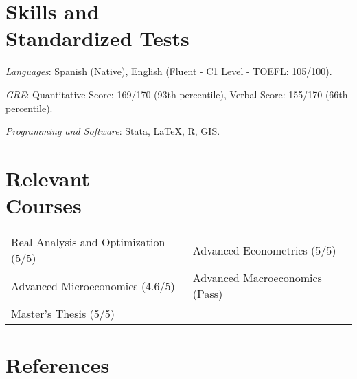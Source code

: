 \documentclass[margin,line]{res}
\begin{document}
\begin{resume}
\vspace{-.2cm}

\section{\sc Skills  and \\ Standardized Tests}

\textit{Languages}: Spanish (Native), English (Fluent - C1 Level - TOEFL: 105/100).

\vspace{-.2cm}

\textit{GRE}: Quantitative Score: 169/170 (93th percentile), Verbal Score: 155/170 (66th percentile).

\vspace{-.2cm}

\textit{Programming and Software}: Stata, {\LaTeX}, \textsc{R}, \textsc{GIS}. 


\section{\sc Relevant \\ Courses}

\begin{tabular}{p{7cm}p{7cm}}
 Real Analysis and Optimization (5/5) &Advanced Econometrics  (5/5)                      \\ 
 Advanced Microeconomics (4.6/5)  & Advanced Macroeconomics (Pass) \\
 Master's Thesis (5/5)   &      \\ 
\end{tabular}

\section{\sc References}


\end{resume}
\end{document}
